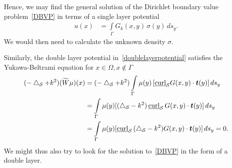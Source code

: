 Hence, we may find the general solution of the Dirichlet boundary value
problem~\eqref{DBVP} in terms of a single layer potential
\begin{align*}
  u(x) & =  \int\limits_\Gamma G_k(x,y) \,\sigma(y) \,ds_{y}. 
\end{align*}
We would then need to calculate the unknown density $\sigma$.
 
Similarly, the double layer potential in~\eqref{doublelayerpotential}
satisfies the Yukawa-Beltrami equation for $x\in \Omega, x\notin\Gamma$
\begin{align*}
  (-\lap_{\S} + k^2)(\widetilde{W}\mu)(x) & = (-\lap_{\S}+k^2)
  \int\limits_\Gamma \mu(y)\, [\underline{\mbox{curl}}_{\S}
  G(x,y)\cdot\vec{t}(y)]\,ds_{y} \\
  &=\int\limits_\Gamma \mu(y)
  [(\lap_{\S}-k^2)\,\underline{\mbox{curl}}_{\S}\,
  G(x,y)\cdot\vec{t}(y)]\,ds_{y} \\ 
  &=\int\limits_\Gamma \mu(y) [\underline{\mbox{curl}}_{\S} \,
  (\lap_{\S} -k^2)G(x,y)\cdot\vec{t}(y)]\,ds_{y} = 0.
\end{align*}
We might thus also try to look for the solution to~\eqref{DBVP} in the
form of a double layer.



